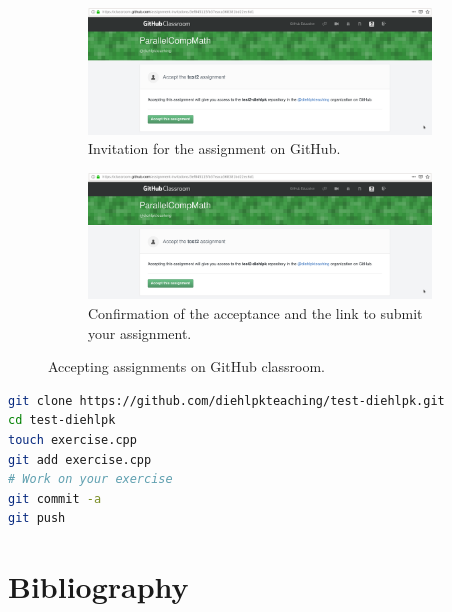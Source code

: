 \documentclass[11pt,fleqn]{book} %
\begin{document}
\begin{figure}[bt]
\centering
\begin{subfigure}{.75\textwidth}
  \centering
\includegraphics[width=\textwidth]{images/2019-05-17-github-assingment}
\caption{Invitation for the assignment on GitHub.}
\label{fig::github:invitation}
\end{subfigure}

\begin{subfigure}{.75\textwidth}
  \centering
\includegraphics[width=\textwidth]{images/2019-05-17-github-assingment}
\caption{Confirmation of the acceptance and the link to submit your assignment.}
\label{fig::github:assignment}
\end{subfigure}
\caption{Accepting assignments on GitHub classroom.}
\end{figure}

\begin{lstlisting}[language=bash,caption={Setting up a ssh key\label{git:push}},float,floatplacement=tb]
git clone https://github.com/diehlpkteaching/test-diehlpk.git
cd test-diehlpk
touch exercise.cpp
git add exercise.cpp
# Work on your exercise
git commit -a
git push
\end{lstlisting}

\newpage
\theendnotes



\chapter*{Bibliography}
\end{document}
